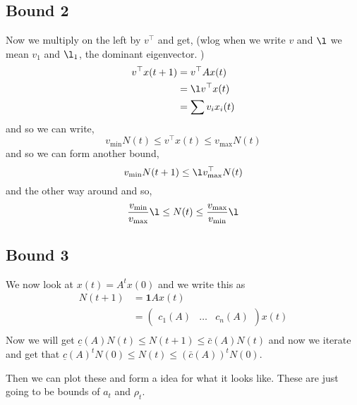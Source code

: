 \subsection{Bound 2}
Now we multiply on the left by $v^\top$ and get, (wlog when we write $v$ and $\l$ we mean $v_1$ and $\l_1$, the dominant eigenvector. )
\begin{align*}
  v^\top x(t+1) &= v^\top Ax(t) \\
  &= \l v^\top x(t) \\
  &= \sum v_i x_i(t) \\
\end{align*}
and so we can write,
$$ v_{\text{min}}N(t) \le v^\top x(t) \le v_{\text{max}}N(t) $$
and so we can form another bound,
$$ v_{\text{min}}N(t+1) \le \l v^\top_{\max}N(t) $$
and the other way around and so,
$$\frac{v_{\text{min}}}{v_{\text{max}}}\l \le N(t) \le \frac{v_{\text{max}}}{v_{\text{min}}}\l $$

\subsection{Bound 3}
We now look at $x(t) = A^tx(0)$ and we write this as
\begin{align*}
  N(t+1) &= \mathbf{1} Ax(t)\\
  &= \begin{pmatrix}
    c_1(A) & \dots & c_n(A)
\end{pmatrix} x(t) \\
\end{align*}
Now we will get $\underline c(A) N(t) \le N(t+1) \le \bar c(A) N(t)$ and now we iterate and get that $\underline c(A)^t N(0) \le N(t) \le (\bar c(A))^tN(0)$.

Then we can plot these and form a idea for what it looks like. These are just going to be bounds of $a_t$ and $\rho_t$.
